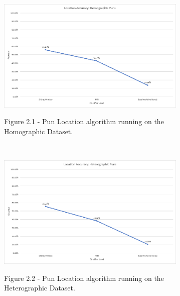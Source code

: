 \documentclass[final]{beamer}
\newlength{\sepwid}
\newlength{\onecolwid}
\newlength{\twocolwid}
\begin{document}
\begin{frame}[t]
\begin{columns}[t]
\begin{column}{\twocolwid}
\begin{columns}[t,totalwidth=\twocolwid]
\begin{column}{\onecolwid}
\begin{figure}
\includegraphics[width=0.85\textwidth]{HomographicLocation.png}\\
\caption{Figure 2.1 - Pun Location algorithm running on the Homographic Dataset.}
\end{figure}
\\
\vspace{20mm}
\begin{figure}
\includegraphics[width=0.85\textwidth]{HeterographicLocation.png}\\
\caption{Figure 2.2 - Pun Location algorithm running on the Heterographic Dataset.}
\end{figure}


\end{column} %

\end{columns} %

\end{column} %

\begin{column}{\sepwid}\end{column} %



\end{columns}
\end{frame}
\end{document}
